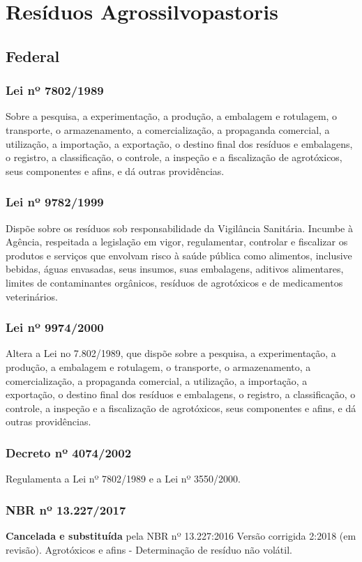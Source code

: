  
\section{Resíduos Agrossilvopastoris}
\begin{subapend}
	\subsection{Federal}
	\begin{subsubapend}
		\item \subsubsection{Lei nº 7802/1989}
		Sobre a pesquisa, a experimentação, a produção, a embalagem e rotulagem, o transporte, o armazenamento, a comercialização, a propaganda comercial, a utilização, a importação, a exportação, o destino final dos resíduos e embalagens, o registro, a classificação, o controle, a inspeção e a fiscalização de agrotóxicos, seus componentes e afins, e dá outras providências.
		\subsubsection{Lei nº 9782/1999}
		Dispõe sobre os resíduos sob responsabilidade da Vigilância Sanitária. Incumbe à Agência, respeitada a legislação em vigor, regulamentar, controlar e fiscalizar os produtos e serviços que envolvam risco à saúde pública como alimentos, inclusive bebidas, águas envasadas, seus insumos, suas embalagens, aditivos alimentares, limites de contaminantes orgânicos, resíduos de agrotóxicos e de medicamentos veterinários.
		\subsubsection{Lei nº 9974/2000}
		Altera a Lei no 7.802/1989, que dispõe sobre a pesquisa, a experimentação, a produção, a embalagem e rotulagem, o transporte, o armazenamento, a comercialização, a propaganda comercial, a utilização, a importação, a exportação, o destino final dos resíduos e embalagens, o registro, a classificação, o controle, a inspeção e a fiscalização de agrotóxicos, seus componentes e afins, e dá outras providências.
		\subsubsection{Decreto nº 4074/2002}
		Regulamenta a Lei nº 7802/1989 e a Lei nº 3550/2000.
		\subsubsection{NBR nº 13.227/2017}
			\textbf{Cancelada e substituída} pela NBR nº 13.227:2016 Versão corrigida 2:2018 (em revisão). Agrotóxicos e afins - Determinação de resíduo não volátil. 

\end{subsubapend}
\end{subapend}
